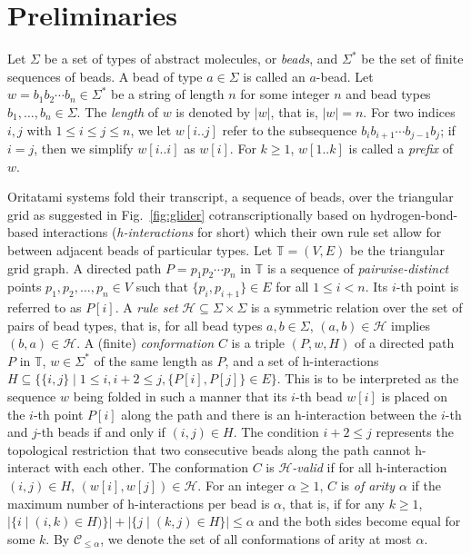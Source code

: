 	\section{Preliminaries}

Let $\Sigma$ be a set of types of abstract molecules, or \textit{beads}, and $\Sigma^*$ be the set of finite sequences of beads. 
A bead of type $a \in \Sigma$ is called an $a$-bead. 
Let $w = b_1 b_2\cdots b_n \in \Sigma^*$ be a string of length $n$ for some integer $n$ and bead types $b_1, \ldots, b_n \in \Sigma$.
The \textit{length} of $w$ is denoted by $|w|$, that is, $|w| = n$. 
For two indices $i,j$ with $1\leq i \leq j \leq n$, we let $w[i..j]$ refer to the subsequence $b_i b_{i+1} \cdots b_{j-1} b_{j}$; if $i=j$, then we simplify $w[i..i]$ as $w[i]$.
For $k \ge 1$, $w[1..k]$ is called a \textit{prefix} of $w$. 

Oritatami systems fold their transcript, a sequence of beads, over the triangular grid as suggested in Fig.~\ref{fig:glider} cotranscriptionally based on hydrogen-bond-based interactions (\textit{h-interactions} for short) which their own rule set allow for between adjacent beads of particular types. 
Let $\mathbb{T} = (V, E)$ be the triangular grid graph. 
A directed path $P = p_1 p_2 \cdots p_n$ in $\mathbb{T}$ is a sequence of \textit{pairwise-distinct} points $p_1, p_2, \ldots, p_n \in V$ such that $\{p_i, p_{i+1}\} \in E$ for all $1 \leq i < n$.
Its $i$-th point is referred to as $P[i]$. 
A \textit{rule set} $\mathcal{H} \subseteq \Sigma \times \Sigma$ is a symmetric relation over the set of pairs of bead types, that is, for all bead types $a, b \in \Sigma$, $(a, b) \in \mathcal{H}$ implies $(b, a) \in \mathcal{H}$. 
A (finite) \textit{conformation} $C$ is a triple $(P, w, H)$ of a directed path $P$ in $\mathbb{T}$, $w \in \Sigma^*$ of the same length as $P$, and a set of h-interactions $H \subseteq \{\{i,j\} \mid 1 \leq i, i+2 \leq j, \{P[i], P[j]\} \in E\}$.
This is to be interpreted as the sequence $w$ being folded in such a manner that its $i$-th bead $w[i]$ is placed on the $i$-th point $P[i]$ along the path and there is an h-interaction between the $i$-th and $j$-th beads if and only if $(i, j) \in H$. 
The condition $i+2 \leq j$ represents the topological restriction that two consecutive beads along the path cannot h-interact with each other.
The conformation $C$ is \textit{$\mathcal{H}$-valid} if for all h-interaction $(i, j) \in H$, $(w[i], w[j]) \in \mathcal{H}$. 
For an integer $\alpha \ge 1$, $C$ is \textit{of arity $\alpha$} if the maximum number of h-interactions per bead is $\alpha$, that is, if for any $k \ge 1$, $|\{i \mid (i, k) \in H)\}| + |\{j \mid (k, j) \in H\}| \le \alpha$ and the both sides become equal for some $k$. 
By $\mathcal{C}_{\le \alpha}$, we denote the set of all conformations of arity at most $\alpha$.

